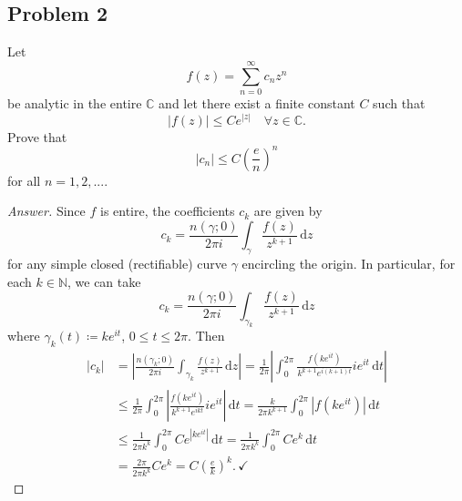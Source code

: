 \documentclass[12pt]{article}
\newcommand{\n}{\mathbb{N}}
\newcommand{\cx}{\mathbb{C}}
\newcommand\paren[1]{\left( #1 \right)}
\newcommand{\abs}[1]{\left| #1 \right|}
\renewcommand{\i}[4]{\int_{#1}^{#2} {#3} \, \mathrm{d} {#4} }
\theoremstyle{definition}
\begin{document}
\subsection{Problem 2 \texorpdfstring{\cite{Evan}}{}}
Let 
\[
    f(z) = \sum\limits_{n = 0}^{\infty} c_n z^n
\]
be analytic in the entire $\cx$ and let there exist a finite constant $C$ such that 
\[
    \abs{f(z)} \leq C e^{|z|} \quad \forall z \in \cx . 
\]
Prove that 
\[
    \abs{ c_n } \leq C \paren{ \frac{e}{n} }^n
\]
for all $n = 1, 2, ...$. 
\begin{proof}[Answer]
    Since $f$ is entire, the coefficients $c_k$ are given by 
    \[
        c_k = \frac{n(\gamma;0)}{2\pi i} \i{\gamma}{}{ \frac{f(z)}{z^{k+1}} }{z}
    \]
    for any simple closed (rectifiable) curve $\gamma$ encircling the origin. In particular, for each $k \in \n$, we can take 
    \[
        c_k = \frac{n(\gamma;0)}{2\pi i} \i{\gamma_k}{}{ \frac{f(z)}{z^{k+1}} }{z}
    \]
    where $\gamma_k(t) \coloneqq k e^{it}$, $0 \leq t \leq 2\pi$. Then 
    \begin{align*}
        \abs{ c_k } & = \abs{ \frac{n \paren{ \gamma_k;0 }}{2\pi i} \i{\gamma_k}{}{ \frac{f(z)}{z^{k+1}} }{z} } = \frac{1}{2\pi} \abs{ \i{0}{2\pi}{ \frac{ f \paren{ k e^{it} } }{ k^{k+1} e^{i(k+1)t} } i e^{it}}{t} } \\
        & \leq \frac{1}{2\pi} \i{0}{2\pi}{ \abs{ \frac{ f \paren{ k e^{it} } }{ k^{k+1} e^{ikt} } i e^{it} } }{t} = \frac{k}{2\pi k^{k+1}} \i{0}{2\pi}{ \abs{ f \paren{ k e^{it} } } }{t} \\ 
        & \leq \frac{1}{2\pi k^{k}} \i{0}{2\pi}{ C e^{\abs{ke^{it}}} }{t} = \frac{1}{2\pi k^{k}} \i{0}{2\pi}{ C e^{k} }{t} \\ 
        & = \frac{2\pi}{2\pi k^k} C e^k = C \paren{ \frac{e}{k} }^k . \, \checkmark 
    \end{align*}
\end{proof}
\end{document}
